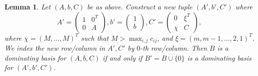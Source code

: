 \documentclass[11pt]{article}
\newtheorem{lemma}[theorem]{Lemma}
\begin{document}
\begin{lemma}\label{lem:0-Row-Column}
Let $(A,b,C)$ be as above. Construct a new tuple $(A',b',C')$ where 
\begin{equation}\label{eq:0-Row-Column}
    A'=\left(\begin{matrix}
        1 & 0^T \\
        0 & A
    \end{matrix}\right),
    b'=\left(\begin{matrix}
        1  \\
        b
    \end{matrix}\right),
    C'=\left(\begin{matrix}
        0 & \xi^T \\
        \chi & C
    \end{matrix}\right),
\end{equation}
where $\chi=(M,\dots,M)^T$ such that $M>\max_{i,j}c_{ij}$, and $\xi=(m,m-1,\dots,2,1)^T$. We index the new row/column in $A',C'$ by $0$-th row/column.
Then $B$ is a dominating basis for $(A,b,C)$ if and only if $B'=B\cup\{0\}$ is a dominating basis for $(A',b',C')$. 

\end{lemma}
\end{document}
